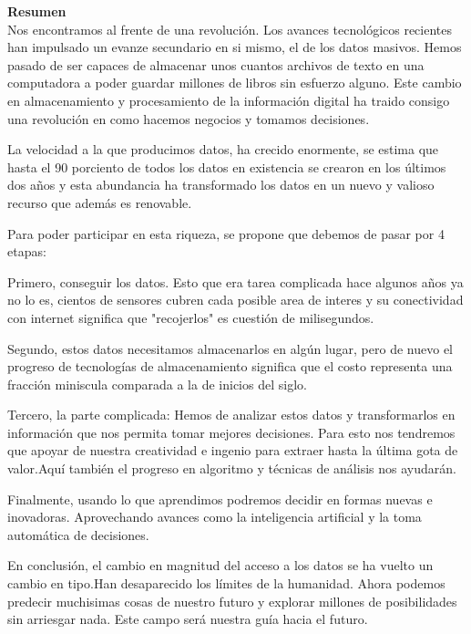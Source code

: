 \documentclass[12pt,a4paper]{article}
\begin{document}
\begin{enumerate}
\begin{enumerate}
				\textbf{Resumen}\\
				Nos encontramos al frente de una revolución.
				Los avances tecnológicos recientes han impulsado
				un evanze secundario en si mismo, el de los datos masivos.
				Hemos pasado de ser capaces de almacenar unos cuantos
				archivos de texto en una computadora a poder guardar
				millones de libros sin esfuerzo alguno.
				Este cambio en almacenamiento y procesamiento
				de la información digital ha traido consigo
				una revolución en como hacemos negocios y tomamos decisiones.

				La velocidad a la que producimos datos, ha crecido
				enormente, se estima que hasta el 90 porciento
				de todos los datos en existencia se crearon
				en los últimos dos años y esta abundancia
				ha transformado los datos en un nuevo y valioso
				recurso que además es renovable.

				Para poder participar en esta riqueza,
				se propone que debemos de pasar por 4 etapas:

				Primero, conseguir los datos.
				Esto que era tarea complicada hace algunos años
				ya no lo es, cientos de sensores cubren cada
				posible area de interes y su conectividad con internet significa
				que "recojerlos" es cuestión de milisegundos.

				Segundo, estos datos necesitamos
				almacenarlos en algún lugar, pero de nuevo el progreso de
				tecnologías de almacenamiento significa que
				el costo representa una fracción miniscula comparada
				a la de inicios del siglo.

				Tercero, la parte complicada:
				Hemos de analizar estos datos y transformarlos en información
				que nos permita tomar mejores decisiones. Para esto
				nos tendremos que apoyar de nuestra creatividad e ingenio
				para extraer hasta la última gota de valor.Aquí
				también el progreso en algoritmo y técnicas de análisis
				nos ayudarán.

				Finalmente, usando lo que aprendimos podremos
				decidir en formas nuevas e inovadoras.
				Aprovechando avances como la inteligencia
				artificial y la toma automática de decisiones.

				En conclusión,
				el cambio en magnitud del acceso a los datos
				se ha vuelto un cambio en tipo.Han desaparecido
				los límites de la humanidad. Ahora podemos
				predecir muchisimas cosas de nuestro futuro
				y explorar millones de posibilidades sin arriesgar
				nada. Este campo será nuestra guía hacia el futuro.


\end{enumerate}
\end{enumerate}
\end{document}
